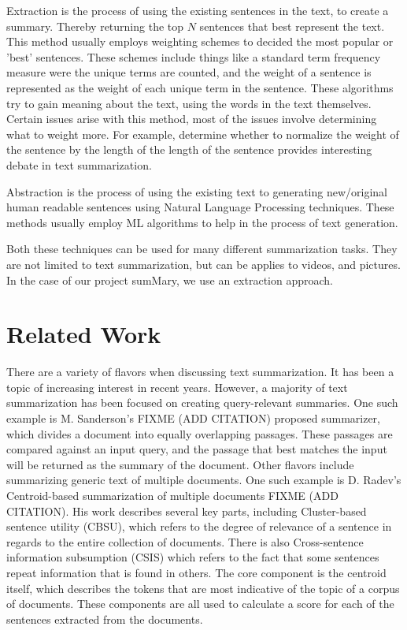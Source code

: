 \documentclass[11pt,a4paper]{article}
\begin{document}
Extraction is the process of using the existing sentences in the text, to create a summary. Thereby returning the top $N$ sentences that best represent the text. This method usually employs weighting schemes to decided the most popular or 'best' sentences. These schemes include things like a standard term frequency measure were the unique terms are counted, and the weight of a sentence is represented as the weight of each unique term in the sentence. These algorithms try to gain meaning about the text, using the words in the text themselves. Certain issues arise with this method, most of the issues involve determining what to weight more. For example, determine whether to normalize the weight of the sentence by the length of the length of the sentence provides interesting debate in text summarization. 

Abstraction is the process of using the existing text to generating new/original human readable sentences using Natural Language Processing techniques. These methods usually employ ML algorithms to help in the process of text generation. 

Both these techniques can be used for many different summarization tasks. They are not limited to text summarization, but can be applies to videos, and pictures. In the case of our project sumMary, we use an extraction approach. 


\section{Related Work}

There are a variety of flavors when discussing text summarization. It has been a topic of increasing interest in recent years. However, a majority of text summarization has been focused on creating query-relevant summaries. One such example is M. Sanderson's FIXME (ADD CITATION) proposed summarizer, which divides a document into equally overlapping passages. These passages are compared against an input query, and the passage that best matches the input will be returned as the summary of the document. Other flavors include summarizing generic text of multiple documents. One such example is D. Radev's Centroid-based summarization of multiple documents FIXME (ADD CITATION). His work describes several key parts, including Cluster-based sentence utility (CBSU), which refers to the degree of relevance of a sentence in regards to the entire collection of documents. There is also Cross-sentence information subsumption (CSIS) which refers to the fact that some sentences repeat information that is found in others. The core component is the centroid itself, which describes the tokens that are most indicative of the topic of a corpus of documents. These components are all used to calculate a score for each of the sentences extracted from the documents.
\end{document}
